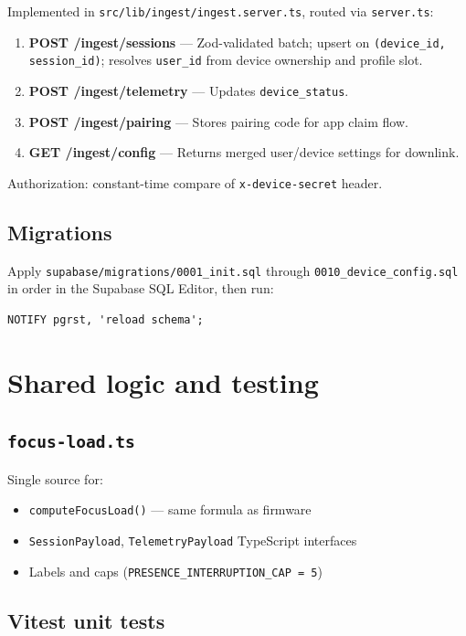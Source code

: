 \documentclass[11pt,a4paper]{report}
\newcommand{\filepath}[1]{\texttt{#1}}
\begin{document}
Implemented in \filepath{src/lib/ingest/ingest.server.ts}, routed via \filepath{server.ts}:

\begin{enumerate}[leftmargin=*]
  \item \textbf{POST /ingest/sessions} --- Zod-validated batch; upsert on
        \texttt{(device\_id, session\_id)}; resolves \texttt{user\_id} from device ownership
        and profile slot.
  \item \textbf{POST /ingest/telemetry} --- Updates \texttt{device\_status}.
  \item \textbf{POST /ingest/pairing} --- Stores pairing code for app claim flow.
  \item \textbf{GET /ingest/config} --- Returns merged user/device settings for downlink.
\end{enumerate}

Authorization: constant-time compare of \texttt{x-device-secret} header.

\section{Migrations}

Apply \filepath{supabase/migrations/0001\_init.sql} through \filepath{0010\_device\_config.sql}
in order in the Supabase SQL Editor, then run:
\begin{lstlisting}
NOTIFY pgrst, 'reload schema';
\end{lstlisting}

\chapter{Shared logic and testing}

\section{\filepath{focus-load.ts}}

Single source for:
\begin{itemize}[leftmargin=*]
  \item \texttt{computeFocusLoad()} --- same formula as firmware
  \item \texttt{SessionPayload}, \texttt{TelemetryPayload} TypeScript interfaces
  \item Labels and caps (\texttt{PRESENCE\_INTERRUPTION\_CAP = 5})
\end{itemize}

\section{Vitest unit tests}
\end{document}
